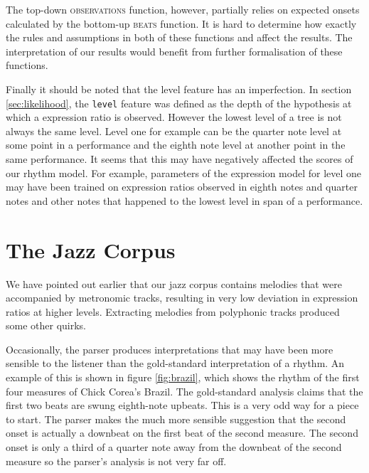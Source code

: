 The top-down \textsc{observations} function, however, partially relies on expected onsets calculated by the bottom-up \textsc{beats} function. It is hard to determine how exactly the rules and assumptions in both of these functions and affect the results. The interpretation of our results would benefit from further formalisation of these functions.

Finally it should be noted that the level feature has an imperfection. In section \ref{sec:likelihood}, the \texttt{level} feature was defined as the depth of the hypothesis at which a expression ratio is observed. However the lowest level of a tree is not always the same level. Level one for example can be the quarter note level at some point in a performance and the eighth note level at another point in the same performance. It seems that this may have negatively affected the scores of our rhythm model. For example, parameters of the expression model for level one may have been trained on expression ratios observed in eighth notes and quarter notes and other notes that happened to the lowest level in span of a performance.


\section{The Jazz Corpus}

We have pointed out earlier that our jazz corpus contains melodies that were accompanied by metronomic tracks, resulting in very low deviation in expression ratios at higher levels. Extracting melodies from polyphonic tracks produced some other quirks.

Occasionally, the parser produces interpretations that may have been more sensible to the listener than the gold-standard interpretation of a rhythm. An example of this is shown in figure \ref{fig:brazil}, which shows the rhythm of the first four measures of Chick Corea's Brazil. The gold-standard analysis claims that the first two beats are swung eighth-note upbeats. This is a very odd way for a piece to start. The parser makes the much more sensible suggestion that the second onset is actually a downbeat on the first beat of the second measure. The second onset is only a third of a quarter note away from the downbeat of the second measure so the parser's analysis is not very far off. 

